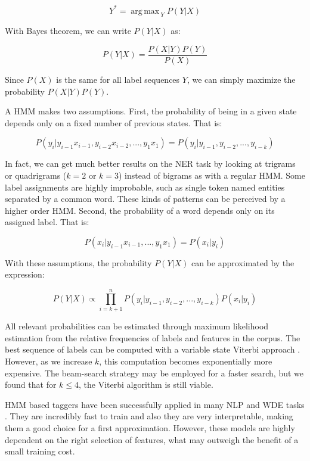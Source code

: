 \documentclass{nle}
\DeclareMathOperator*{\argmax}{arg\,max\,}
\begin{document}
\begin{equation}
Y^* = \argmax_{Y} P(Y|X)
\end{equation}

With Bayes theorem, we can write $ P(Y|X) $ as:

\begin{equation}
P(Y|X) = \frac{P(X|Y) P(Y)}{P(X)}
\end{equation}

Since $ P(X) $ is the same for all label sequences $ Y $, we can simply maximize
the probability $ P(X|Y) P(Y) $.

A HMM makes two assumptions. First, the probability of being in a given state depends 
only on a fixed number of previous states. That is:

\begin{equation}
P(y_i|y_{i-1}x_{i-1}, y_{i-2}x_{i-2}, ..., y_1x_1) = P(y_i|y_{i-1}, y_{i-2},..., y_{i-k})
\end{equation}

In fact, we can get much better results on the NER task by looking at trigrams
or quadrigrams ($ k = 2 $ or $ k = 3 $) instead of bigrams as with a regular HMM. 
Some label assignments are highly improbable, such as single token named entities 
separated by a common word. These kinds of patterns can be perceived by a higher order HMM.
Second, the probability of a word depends only on its assigned label. That is:

\begin{equation}
P(x_i|y_{i-1}x_{i-1}, ..., y_1x_1) = P(x_i|y_i)
\end{equation}

With these assumptions, 
the probability $ P(Y|X) $ can be approximated by the expression:

\begin{equation}
P(Y|X) \propto \prod_{i=k+1}^{n} P(y_i|y_{i-1}, y_{i-2}, ..., y_{i-k}) P(x_i|y_i)
\end{equation}

All relevant probabilities can be estimated through maximum likelihood estimation from the relative
frequencies of labels and features in the corpus. The best sequence of labels can be computed 
with a variable state Viterbi approach \cite{Li2000}. However, as we increase $ k $, this computation 
becomes exponentially more expensive. The beam-search strategy may be employed for a faster 
search, but we found that for $ k \leq 4 $, the Viterbi algorithm is still viable.

HMM based taggers have been successfully applied in many NLP and WDE tasks 
\cite{Rabiner1990,Freitag2000}. They are incredibly fast to train and also they are very 
interpretable, making them a good choice for a first approximation. However, these models 
are highly dependent on the right selection of features, what may outweigh the benefit of a 
small training cost.
\end{document}
